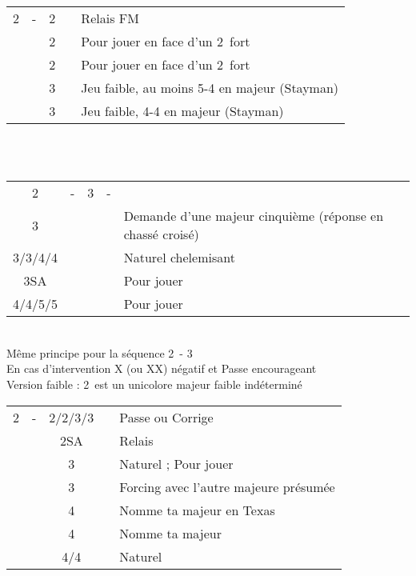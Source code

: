 \documentclass[a4paper, oneside, 11pt]{report}
\begin{document}
	\begin{tabular}{cccc|l}
	2\trefle & - & 2\carreau && Relais FM\\
	&& 2\coeur && Pour jouer en face d'un 2\coeur\ fort\\
	&& 2\pique && Pour jouer en face d'un 2\pique\ fort\\
	&& 3\trefle && Jeu faible, au moins 5-4 en majeur (Stayman)\\
	&& 3\carreau && Jeu faible, 4-4 en majeur (Stayman)\\
	\end{tabular}\\\\
	
	\begin{tabular}{cccc|l}
	2\trefle & - & 3\trefle & - &\\
	3\carreau &&&& Demande d'une majeur cinquième (réponse en chassé croisé)\\
	3\coeur/3\pique/4\trefle/4\carreau &&&& Naturel chelemisant\\
	3SA &&&& Pour jouer\\
	4\coeur/4\pique/5\trefle/5\carreau &&&& Pour jouer\\	
	\end{tabular}\\
	Même principe pour la séquence 2\trefle\ - 3\carreau\\

	En cas d'intervention X (ou XX) négatif et Passe encourageant\\	

	Version faible : 2\carreau\ est un unicolore majeur faible indéterminé\\

	\begin{tabular}{cccc|l}
	2\carreau & - & 2\coeur/2\pique/3\coeur/3\pique && Passe ou Corrige\\
	&& 2SA && Relais\\
	&& 3\trefle && Naturel ; Pour jouer\\
	&& 3\carreau && Forcing avec l'autre majeure présumée\\
	&& 4\trefle && Nomme ta majeur en Texas\\
	&& 4\carreau && Nomme ta majeur\\
	&& 4\coeur/4\pique && Naturel\\
	\end{tabular}\\\\
\end{document}
